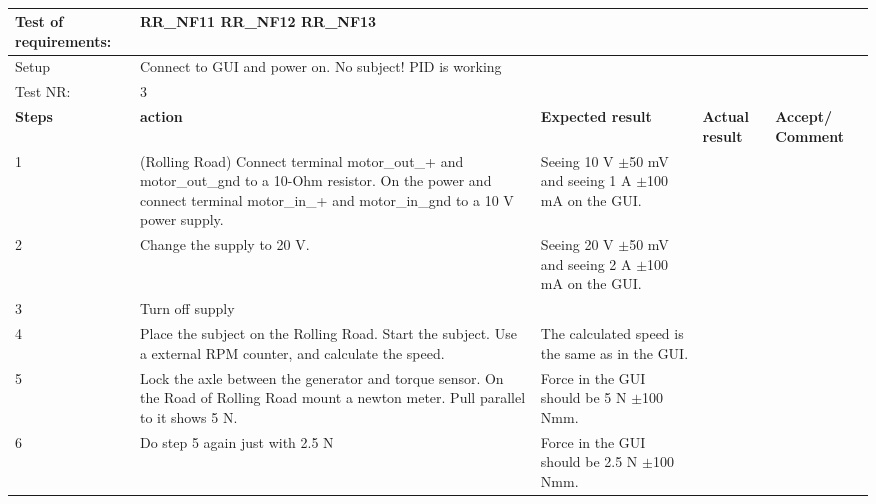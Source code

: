 \begin{table}[h!]
	\centering
	\label{my-label}	
	\begin{tabular}{|p{1.5 cm}|p{4.2 cm}|p{2.1 cm}|p{2.1 cm}|p{2.1 cm}|}
		\hline
		Test of requirements: 
		& \multicolumn{4}{l|}{RR\_NF11 RR\_NF12 RR\_NF13} \\ \hline
		Setup 
		& \multicolumn{4}{l|}{Connect to GUI and power on. No subject! PID is working} \\ \hline
		Test NR:
		& \multicolumn{4}{l|}{3} \\ \hline
		\textbf{Steps} & \textbf{action} & \textbf{Expected result} & 
		\textbf{Actual result} & \textbf{Accept/ Comment} \\ \hline
		1 
		& (Rolling Road) Connect terminal motor\_out\_+ and motor\_out\_gnd to a 10-Ohm resistor. On the power and connect terminal motor\_in\_+ and motor\_in\_gnd to a 10 V power supply.  
		& Seeing 10 V $\pm$50 mV and seeing 1 A $\pm$100 mA on the GUI. 
		&
		& \\ \hline
		2
		& Change the supply to 20 V.
		& Seeing 20 V $\pm$50 mV and seeing 2 A $\pm$100 mA on the GUI.
		&
		& \\ \hline
		3
		& Turn off supply
		& 
		&
		& \\ \hline
		4
		& Place the subject on the Rolling Road. Start the subject. Use a external RPM counter, and calculate the speed. 
		& The calculated speed is the same as in the GUI.
		&
		& \\ \hline
		5
		& Lock the axle between the generator and torque sensor. On the Road of Rolling Road mount a newton meter. Pull parallel to it shows 5 N.  
		& Force in the GUI should be 5 N $\pm$100 Nmm.
		&
		& \\ \hline
		6
		& Do step 5 again just with 2.5 N 
		& Force in the GUI should be 2.5 N $\pm$100 Nmm.
		&
		& \\ \hline
	\end{tabular}
	\caption{}
\end{table}


